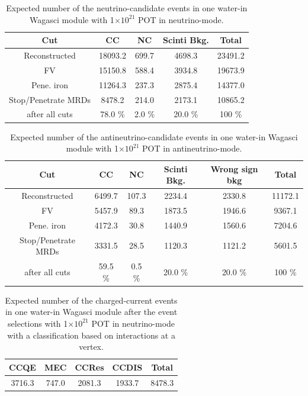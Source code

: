 \begin{table}[htb]
  \begin{center}
    \caption{Expected number of the neutrino-candidate events in one water-in Wagasci module with 1$\times 10^{21}$ POT in neutrino-mode.}
    \begin{tabular}{c|ccc|c} \hline
Cut   & CC & NC & Scinti Bkg. & Total \\ \hline
Reconstructed & 18093.2 & 699.7 & 4698.3 & 23491.2 \\
FV & 15150.8 & 588.4 & 3934.8 & 19673.9 \\
Pene. iron & 11264.3 & 237.3 & 2875.4 & 14377.0 \\
Stop/Penetrate MRDs & 8478.2 & 214.0 & 2173.1 & 10865.2 \\ \hline
after all cuts & 78.0 \% & 2.0 \% & 20.0 \% & 100 \% \\
\hline
    \end{tabular}
    \label{tab:expected_num_events_neutrino_beam}
  \end{center}
\end{table}

\begin{table}[htb]
  \begin{center}
    \caption{Expected number of the antineutrino-candidate events in one water-in Wagasci module with 1$\times 10^{21}$ POT in antineutrino-mode.}
    \begin{tabular}{c|cccc|c} \hline
 Cut   & CC & NC & Scinti Bkg. & Wrong sign bkg & Total \\ \hline
Reconstructed & 6499.7 & 107.3 & 2234.4 & 2330.8 & 11172.1 \\ 
FV & 5457.9 & 89.3 & 1873.5 & 1946.6 & 9367.1 \\ 
Pene. iron & 4172.3 & 30.8 & 1440.9 & 1560.6 & 7204.6 \\ 
Stop/Penetrate MRDs & 3331.5 & 28.5 & 1120.3 & 1121.2 & 5601.5 \\ \hline
after all cuts & 59.5 \% & 0.5 \% & 20.0 \% &  20.0 \% & 100 \% \\
\hline
    \end{tabular}
    \label{tab:expected_num_events_antineutrino_beam}
  \end{center}
\end{table}

\begin{table}[htb]
  \begin{center}
    \caption{Expected number of the charged-current events in one water-in Wagasci module after the event selections with 1$\times 10^{21}$ POT in neutrino-mode with a classification based on interactions at a vertex.}
    \begin{tabular}{cccc|c} \hline
CCQE & MEC & CCRes & CCDIS & Total \\ \hline
3716.3 & 747.0 & 2081.3 & 1933.7 & 8478.3 \\
\hline
    \end{tabular}
    \label{tab:expected_num_cc_events_neutrino_beam}
  \end{center}
\end{table}


